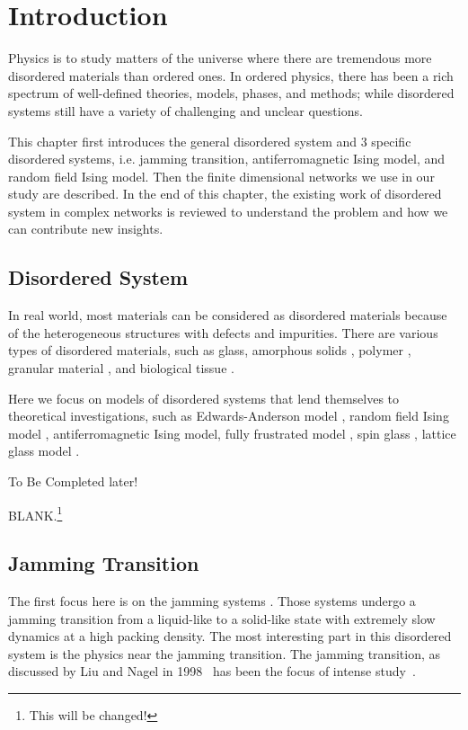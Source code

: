 \chapter{Introduction}
\label{chap-intro}

Physics is to study matters of the universe where 
there are tremendous more disordered materials than ordered ones.
In ordered physics, there has been a rich spectrum of 
well-defined theories, models, phases, and methods; while disordered 
systems still have a variety of challenging and unclear questions. 

This chapter first introduces the general disordered system and 3 specific disordered systems, i.e. jamming transition, antiferromagnetic Ising model, and random field Ising model. Then the finite dimensional networks we use in our study are described. In the end of this chapter, the existing work of disordered system in complex networks is reviewed to understand the problem and how we can contribute new insights.

\section{Disordered System}
In real world, most materials can be considered as disordered materials because of the heterogeneous structures with defects and impurities. There are various types of disordered materials, such as glass\cite{Gibbs1958nature}, amorphous solids \cite{berthier2016facets}, polymer \cite{roth2005glass}, granular material \cite{richard2005slow}, and biological tissue \cite{bi2015density}. 

Here we focus on models of disordered systems that lend themselves to theoretical investigations, such as Edwards-Anderson model \cite{edwards1975theory}, random field Ising model \cite{imry1975random}, antiferromagnetic Ising model\cite{wannier1950afm},  fully frustrated model \cite{kosterlitz1973ordering, kosterlitz1974critical}, spin glass \cite{young1997spin}, lattice glass model \cite{Biroli02}. 

To Be Completed later!

BLANK.\footnote{This will be changed!}

\section{Jamming Transition}
\label{sec:jam_intro}
The first focus here is on the jamming systems \cite{Biroli2007}. Those systems undergo 
a jamming transition from a liquid-like to a solid-like state with extremely slow 
dynamics at a high packing density. The most interesting part in this 
disordered system is the physics near the jamming transition. 
The jamming transition, as discussed by Liu and
Nagel in 1998~\cite{Liu1998} has been the focus of
intense study~\cite{Biroli2007,Liu2010,Berthier2011}. 

